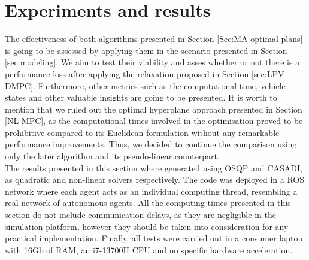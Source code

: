 \documentclass[a4paper,fleqn]{cas-sc}
\begin{document}


\section{Experiments and results}
\label{seq:exp}
The effectiveness of both algorithms presented in Section \ref{Sec:MA optimal plans} is going to be assessed by applying them in the scenario presented in Section \ref{sec:modeling}. We aim to test their viability and asses whether or not there is a performance loss after applying the relaxation proposed in Section \ref{sec:LPV - DMPC}. Furthermore, other metrics such as the computational time, vehicle states and other valuable insights are going to be presented. It is worth to mention that we ruled out the optimal hyperplane approach presented in Section \ref{NL MPC}, as the computational times involved in the optimisation proved to be prohibitive compared to its Euclidean formulation without any remarkable performance improvements. Thus, we decided to continue the comparison using only the later algorithm and its pseudo-linear counterpart.\\

The results presented in this section where generated using OSQP and CASADI, as quadratic and non-linear solvers respectively. The code was deployed in a ROS network where each agent acts as an individual computing thread, resembling a real network of autonomous agents. All the computing times presented in this section do not include communication delays, as they are negligible in the simulation platform, however they should be taken into consideration for any practical implementation. Finally, all tests were carried out in a consumer laptop with 16Gb of RAM, an i7-13700H CPU and no specific hardware acceleration.\\ 
\end{document}
